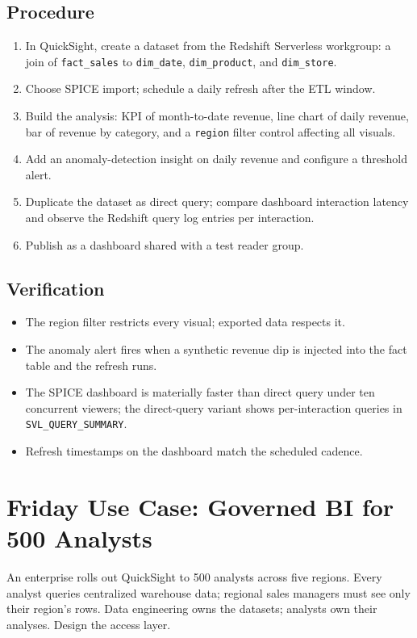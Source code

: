 \subsection*{Procedure}
\begin{enumerate}
    \item In QuickSight, create a dataset from the Redshift Serverless workgroup: a join of \texttt{fact\_sales} to \texttt{dim\_date}, \texttt{dim\_product}, and \texttt{dim\_store}.
    \item Choose SPICE import; schedule a daily refresh after the ETL window.
    \item Build the analysis: KPI of month-to-date revenue, line chart of daily revenue, bar of revenue by category, and a \texttt{region} filter control affecting all visuals.
    \item Add an anomaly-detection insight on daily revenue and configure a threshold alert.
    \item Duplicate the dataset as direct query; compare dashboard interaction latency and observe the Redshift query log entries per interaction.
    \item Publish as a dashboard shared with a test reader group.
\end{enumerate}

\subsection*{Verification}
\begin{itemize}
    \item The region filter restricts every visual; exported data respects it.
    \item The anomaly alert fires when a synthetic revenue dip is injected into the fact table and the refresh runs.
    \item The SPICE dashboard is materially faster than direct query under ten concurrent viewers; the direct-query variant shows per-interaction queries in \texttt{SVL\_QUERY\_SUMMARY}.
    \item Refresh timestamps on the dashboard match the scheduled cadence.
\end{itemize}

\section{Friday Use Case: Governed BI for 500 Analysts}
An enterprise rolls out QuickSight to 500 analysts across five regions. Every analyst queries centralized warehouse data; regional sales managers must see only their region's rows. Data engineering owns the datasets; analysts own their analyses. Design the access layer.

